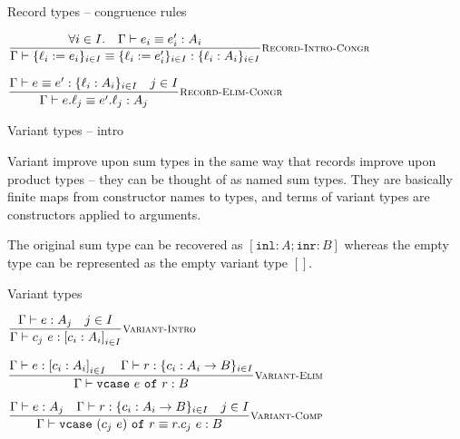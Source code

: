 \documentclass{beamer}
\begin{document}
\begin{frame}{Record types -- congruence rules}

\begin{center}
  $\infrule[Record-Intro-Congr]{\forall i \in I. \quad \compeq{e_i}{e_i'}{A_i}}{\compeq{\records{\ell}{e}{i}{I}}{\records{\ell}{e'}{i}{I}}{\recordtypes{\ell}{A}{i}{I}}}$

  \vspace{2em}

  $\infrule[Record-Elim-Congr]{\compeq{e}{e'}{\recordtypes{\ell}{A}{i}{I}} \quad \sidecond{j \in I}}{\compeq{\proj{\ell_j}{e}}{\proj{\ell_j}{e'}}{A_j}}$
\end{center}

\end{frame}

\newcommand{\varianttype}[1]{\left[#1\right]}
\newcommand{\varianttypes}[4]{\varianttype{#1_{#3} : #2_{#3}}_{#3 \in #4}}
\newcommand{\vcase}[2]{\texttt{vcase}\ #1\ \texttt{of}\ #2}

\begin{frame}{Variant types -- intro}

Variant improve upon sum types in the same way that records improve upon product types -- they can be thought of as named sum types. They are basically finite maps from constructor names to types, and terms of variant types are constructors applied to arguments.

\vspace{1em}

The original sum type can be recovered as $\varianttype{\texttt{inl} : A; \texttt{inr} : B}$ whereas the empty type can be represented as the empty variant type $\varianttype{}$.
\end{frame}

\begin{frame}{Variant types}

\begin{center}
  $\infrule[Variant-Intro]{\typing{e}{A_j} \quad \sidecond{j \in I}}{\typing{\app{c_j}{e}}{\varianttypes{c}{A}{i}{I}}}$

  \vspace{2em}

  $\infrule[Variant-Elim]{\typing{e}{\varianttypes{c}{A}{i}{I}} \quad \typing{r}{\recordtype{c_i : \Fun{A_i}{B}}_{i \in I}}}{\typing{\vcase{e}{r}}{B}}$

  \vspace{2em}

  $\infrule[Variant-Comp]{\typing{e}{A_j} \quad \typing{r}{\recordtype{c_i : \Fun{A_i}{B}}_{i \in I}} \quad \sidecond{j \in I}}{\compeq{\vcase{(\app{c_j}{e})}{r}}{\app{\proj{c_j}{r}}{e}}{B}}$
\end{center}

\end{frame}
\end{document}

